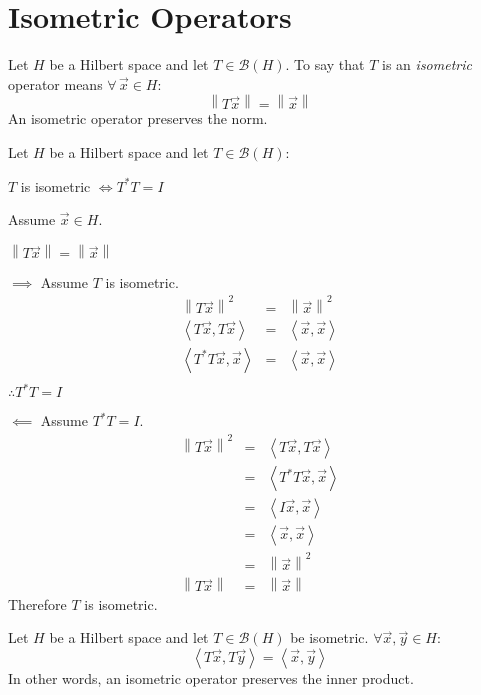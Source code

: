 \documentclass[letterpaper,12pt,fleqn]{article}
\newcommand{\mb}{\mathcal{B}}
\newcommand{\vx}{\vec{x}}
\newcommand{\vy}{\vec{y}}
\newcommand{\norm}[1]{\left\|#1\right\|}
\newcommand{\inner}[1]{\left<#1\right>}
\begin{document}
\section*{Isometric Operators}

\begin{definition}[Isometric]
  Let $H$ be a Hilbert space and let $T\in\mb(H)$. To say that $T$ is an
  \emph{isometric} operator means $\forall\,\vx\in H$:
  \[\norm{T\vx}=\norm{\vx}\]
  An isometric operator preserves the norm.
\end{definition}

\begin{theorem}
  Let $H$ be a Hilbert space and let $T\in\mb(H)$:

  \qquad$T$ is isometric $\iff T^*T=I$
\end{theorem}

\begin{theproof}
  Assume $\vx\in H$.
  
  $\norm{T\vx}=\norm{\vx}$

  \begin{description}
  \item $\implies$ Assume $T$ is isometric.
    \begin{eqnarray*}
      \norm{T\vx}^2 &=& \norm{\vx}^2 \\
      \inner{T\vx,T\vx} &=& \inner{\vx,\vx} \\
      \inner{T^*T\vx,\vx} &=& \inner{\vx,\vx} \\
    \end{eqnarray*}
    $\therefore T^*T=I$
    
  \item $\impliedby$ Assume $T^*T=I$.
    \begin{eqnarray*}
      \norm{T\vx}^2 &=& \inner{T\vx,T\vx} \\
      &=& \inner{T^*T\vx,\vx} \\
      &=& \inner{I\vx,\vx} \\
      &=& \inner{\vx,\vx} \\
      &=& \norm{\vx}^2 \\
      \norm{T\vx} &=& \norm{\vx}
    \end{eqnarray*}
    Therefore $T$ is isometric.
  \end{description}
\end{theproof}

\begin{theorem}
  Let $H$ be a Hilbert space and let $T\in\mb(H)$ be isometric.
  $\forall\vx,\vy\in H$:
  \[\inner{T\vx,T\vy}=\inner{\vx,\vy}\]
  In other words, an isometric operator preserves the inner product.
\end{theorem}
\end{document}

